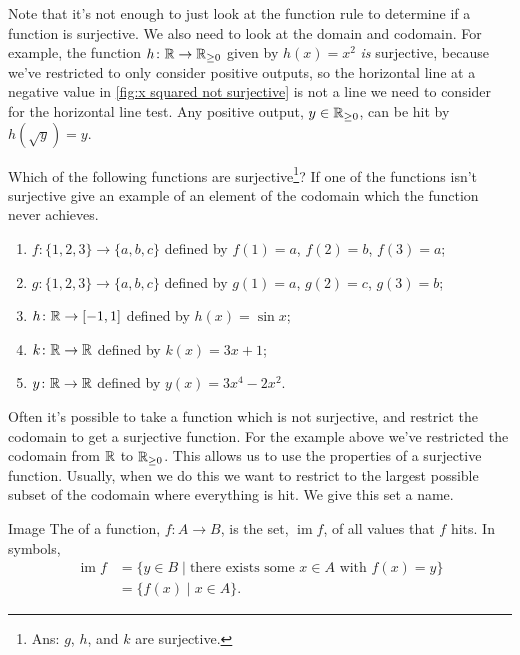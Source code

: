 \documentclass[fleqn]{LectureClass/LectureClass}
\DeclareMathOperator{\im}{im}
\begin{document}
    Note that it's not enough to just look at the function rule to determine if a function is surjective.
    We also need to look at the domain and codomain.
    For example, the function \(h \colon \mathbb{R} \to \mathbb{R}_{\ge 0}\) given by \(h(x) = x^2\) \emph{is} surjective, because we've restricted to only consider positive outputs, so the horizontal line at a negative value in \cref{fig:x squared not surjective} is not a line we need to consider for the horizontal line test.
    Any positive output, \(y \in \mathbb{R}_{\ge 0}\), can be hit by \(h(\sqrt{y}) = y\).
    
    \begin{problem}{}{}
        Which of the following functions are surjective\footnote{Ans: \(g\), \(h\), and \(k\) are surjective.}?
        If one of the functions isn't surjective give an example of an element of the codomain which the function never achieves.
        \begin{enumerate}
            \item \(f \colon \{1, 2, 3\} \to \{a, b, c\}\) defined by \(f(1) = a\), \(f(2) = b\), \(f(3) = a\);
            \item \(g \colon \{1, 2, 3\} \to \{a, b, c\}\) defined by \(g(1) = a\), \(g(2) = c\), \(g(3) = b\);
            \item \(h \colon \mathbb{R} \to [-1, 1]\) defined by \(h(x) = \sin x\);
            \item \(k \colon \mathbb{R} \to \mathbb{R}\) defined by \(k(x) = 3x + 1\);
            \item \(y \colon \mathbb{R} \to \mathbb{R}\) defined by \(y(x) = 3x^4 - 2x^2\).
        \end{enumerate}
    \end{problem}
    
    Often it's possible to take a function which is not surjective, and restrict the codomain to get a surjective function.
    For the example above we've restricted the codomain from \(\mathbb{R}\) to \(\mathbb{R}_{\ge 0}\).
    This allows us to use the properties of a surjective function.
    Usually, when we do this we want to restrict to the largest possible subset of the codomain where everything is hit.
    We give this set a name.
    
    \begin{dfn}{Image}{}
        The  of a function, \(f \colon A \to B\), is the set, \(\im f\), of all values that \(f\) hits.
        In symbols,
        \begin{align}
            \im f &= \{y \in B \mid \text{there exists some }x \in A \text{ with } f(x) = y\}\\
            &= \{f(x) \mid x \in A\}.
        \end{align}
    \end{dfn}
    
\end{document}
